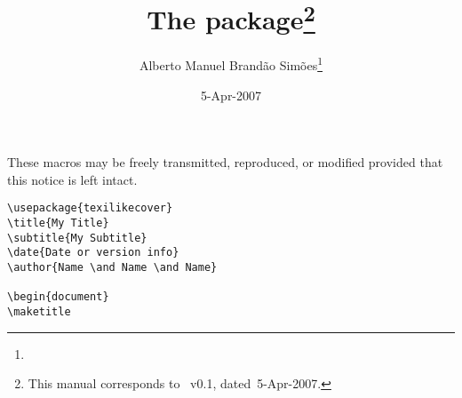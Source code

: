 \documentclass[pagesize=auto, fontsize=14pt, parskip=full, DIV=9]{scrartcl}
\title{The \pkg{texilikecover} package\thanks{This manual corresponds to \pkg{texilikecover.sty}~v0.1, dated~5-Apr-2007.}}
\author{Alberto Manuel Brandão Simões\thanks{\mail{ambs@cpan.org}}}
\date{5-Apr-2007}
\begin{document}
\maketitle

These macros may be freely transmitted, reproduced, or modified
provided that this notice is left intact.



\begin{lstlisting}
\usepackage{texilikecover}
\title{My Title}
\subtitle{My Subtitle}
\date{Date or version info}
\author{Name \and Name \and Name}

\begin{document}
\maketitle
\end{lstlisting}
\end{document}
